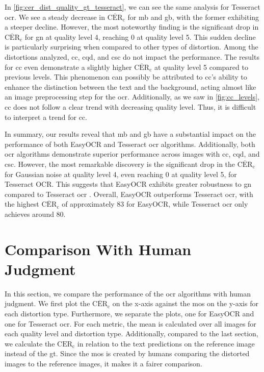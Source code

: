 In \autoref{fig:cer_dist_quality_gt_tesseract}, we can see the same analysis for Tesseract \gls{ocr}.
We see a steady decrease in $\overline{\text{CER}}_{\text{c}}$ for \gls{mb} and \gls{gb}, with the former exhibiting a steeper decline.
However, the most noteworthy finding is the significant drop in $\overline{\text{CER}}_{\text{c}}$ for \gls{gn} at quality level 4, reaching 0 at quality level 5.
This sudden decline is particularly surprising when compared to other types of distortion.
Among the distortions analyzed, \gls{cc}, \gls{cqd}, and \gls{csc} do not impact the performance.
The results for \gls{cc} even demonstrate a slightly higher $\overline{\text{CER}}_{\text{c}}$ at quality level 5 compared to previous levels.
This phenomenon can possibly be attributed to \gls{cc}'s ability to enhance the distinction between the text and the background, acting almost like an image preprocessing step for the \gls{ocr}.
Additionally, as we saw in \autoref{fig:cc_levels}, \gls{cc} does not follow a clear trend with decreasing quality level.
Thus, it is difficult to interpret a trend for \gls{cc}.

In summary, our results reveal that \gls{mb} and \gls{gb} have a substantial impact on the performance of both EasyOCR and Tesseract \gls{ocr} algorithms.
Additionally, both \gls{ocr} algorithms demonstrate superior performance across images with \gls{cc}, \gls{cqd}, and \gls{csc}.
However, the most remarkable discovery is the significant drop in the $\overline{\text{CER}}_{\text{c}}$ for Gaussian noise at quality level 4, even reaching 0 at quality level 5, for Tesseract OCR.
This suggests that EasyOCR exhibits greater robustness to \gls{gn} compared to Tesseract \gls{ocr} .
Overall, EasyOCR outperforms Tesseract \gls{ocr}, with the highest $\overline{\text{CER}}_{\text{c}}$ of approximately 83 for EasyOCR, while Tesseract \gls{ocr} only achieves around 80.




\section{Comparison With Human Judgment}
\label{sec:comparison_with_human_judgment}

In this section, we compare the performance of the \gls{ocr} algorithms with human judgment.
We first plot the $\overline{\text{CER}}_{\text{c}}$ on the x-axis against the \gls{mos} on the y-axis for each distortion type.
Furthermore, we separate the plots, one for EasyOCR and one for Tesseract \gls{ocr}.
For each metric, the mean is calculated over all images for each quality level and distortion type.
Additionally, compared to the last section, we calculate the $\text{CER}_{\text{c}}$ in relation to the text predictions on the reference image instead of the \gls{gt}.
Since the \gls{mos} is created by humans comparing the distorted images to the reference images, it makes it a fairer comparison.

